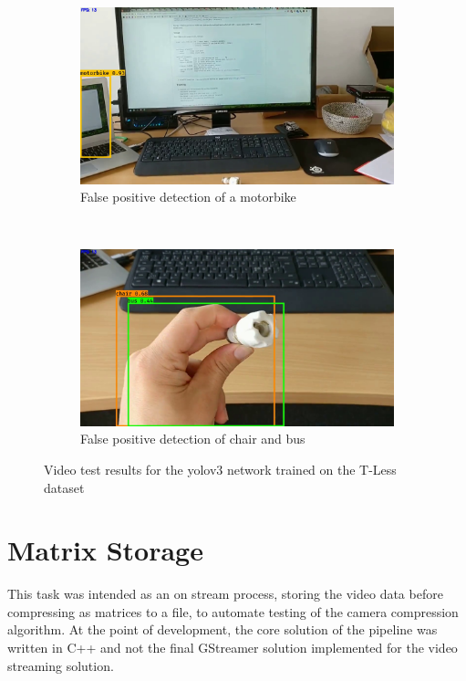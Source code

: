 \begin{figure}[H]
	\begin{subfigure}[b]{0.48\textwidth}
	\includegraphics[width=\textwidth]{figures/tens3}
	\caption{False positive detection of a motorbike}
	\label{fig:tens3}
	\end{subfigure}
	~
	\begin{subfigure}[b]{0.48\textwidth}
		\includegraphics[width=\textwidth]{figures/tens4}
		\caption{False positive detection of chair and bus}
		\label{fig:tens4}
	\end{subfigure}
	\caption{Video test results for the \gls{yolo}v3 network trained on the T-Less dataset}
	\label{fig:tens_accuracy}
\end{figure} 

\section{Matrix Storage}
This task was intended as an on stream process, storing the video data before compressing as matrices to a file, to automate testing of the camera compression algorithm. At the point of development, the core solution of the pipeline was written in C++ and not the final GStreamer solution implemented for the video streaming solution.

